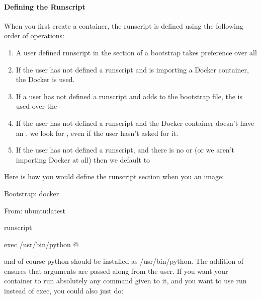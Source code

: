 \documentclass[letterpaper,10pt,english]{sphinxmanual}
\begin{document}
\paragraph{Defining the Runscript}
\label{\detokenize{appendix:defining-the-runscript}}
When you first create a container, the runscript is defined using the
following order of operations:
\begin{enumerate}
\item {} 
A user defined runscript in the  section of a bootstrap takes preference over all

\item {} 
If the user has not defined a runscript and is importing a Docker container, the Docker  is used.

\item {} 
If a user has not defined a runscript and adds  to the bootstrap file, the  is used over the 

\item {} 
If the user has not defined a runscript and the Docker container doesn’t have an , we look for , even if the user hasn’t asked for it.

\item {} 
If the user has not defined a runscript, and there is no  or  (or we aren’t importing Docker at all) then we default to 

\end{enumerate}

Here is how you would define the runscript section when you {\hyperref[\detokenize{build_a_container:build-a-container}]{}} an image:

%
\begin{sphinxVerbatim}[commandchars=\\\{\}]
Bootstrap: docker

From: ubuntu:latest


\PYGZpc{}runscript

exec /usr/bin/python \PYGZdq{}\PYGZdl{}@\PYGZdq{}
\end{sphinxVerbatim}

and of course python should be installed as /usr/bin/python. The
addition of  ensures that arguments are passed along from the user. If
you want your container to run absolutely any command given to it, and
you want to use run instead of exec, you could also just do:
\end{document}
